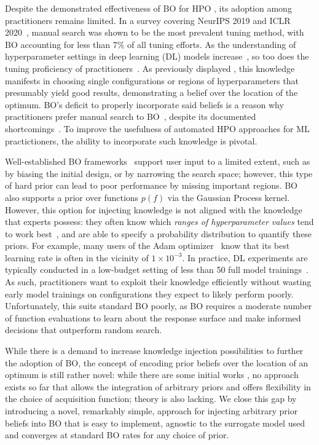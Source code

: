 \documentclass{article}
\begin{document}
Despite the demonstrated effectiveness of BO for HPO \citep{bergstra-nips11a, pmlr-v133-turner21a}, its adoption among practitioners remains limited. In a survey covering NeurIPS 2019 and ICLR 2020~\citep{bouthillier:survey}, manual search was shown to be the most prevalent tuning method, with BO accounting for less than 7\% of all tuning efforts.  As the understanding of hyperparameter settings in deep learning (DL) models increase~\citep{smith2018disciplined}, so too does the tuning proficiency of practitioners~\citep{Anand2020BlackMI}. As previously displayed \citep{smith2018disciplined, Anand2020BlackMI, souza2021bayesian, atmseer}, this knowledge manifests in choosing single configurations or regions of hyperparameters that presumably yield good results, demonstrating a belief over the location of the optimum. BO's deficit to properly incorporate said beliefs is a reason why practitioners prefer manual search to BO~\citep{atmseer}, despite its documented shortcomings~\citep{JMLR:v13:bergstra12a}. To improve the usefulness of automated HPO approaches for ML practictioners, the ability to incorporate such knowledge is pivotal. 

Well-established BO frameworks~\citep{snoek-nips12a, smac, gpyopt2016, Dragonfly, balandat2020botorch} support user input to a limited extent, such as by biasing the initial design, or by narrowing the search space; however, this type of hard prior can lead to poor performance by missing important regions. BO also supports a prior over functions $p(f)$ via the Gaussian Process kernel. However, this option for injecting knowledge is not aligned with the knowledge that experts possess: they often know which \textit{ranges of hyperparameter values} tend to work best~\citep{Perrone2019LearningSS, smith2018disciplined, atmseer}, and are able to specify a probability distribution to quantify these priors. For example, many users of the Adam optimizer~\citep{kingma2014adam} know that its best learning rate is often in the vicinity of $1\times10^{-3}$. In practice, DL experiments are typically conducted in a low-budget setting of less than 50 full model trainings~\citep{bouthillier:survey}. As such, practitioners want to exploit their knowledge efficiently without wasting early model trainings on configurations they expect to likely perform poorly. Unfortunately, this suits standard BO poorly, as BO requires a moderate number of function evaluations to learn about the response surface and make informed decisions that outperform random search.

While there is a demand to increase knowledge injection possibilities to further the adoption of BO, the concept of encoding prior beliefs over the location of an optimum is still rather novel: while there are some initial works \citep{RAMACHANDRAN2020105663, Li2020IncorporatingEP, souza2021bayesian}, no approach exists so far that allows the integration of 
arbitrary priors 
and offers flexibility in the choice of acquisition function; theory is also lacking.
We close this gap by introducing a novel, remarkably simple, approach for injecting arbitrary prior beliefs into BO that is easy to implement, agnostic to the surrogate model used and converges at standard BO rates for any choice of prior.
\end{document}
